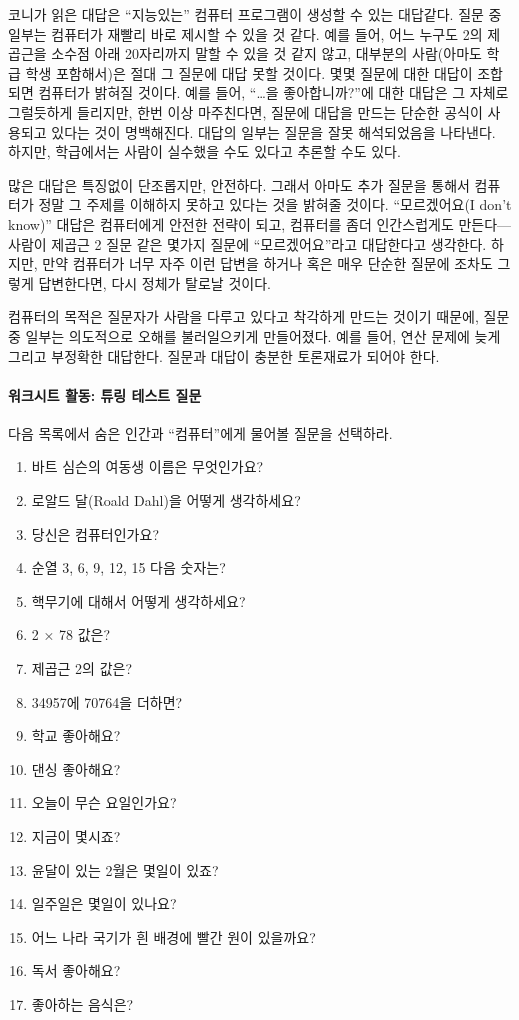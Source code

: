 \documentclass[]{article}
\begin{document}
코니가 읽은 대답은 ``지능있는'' 컴퓨터 프로그램이 생성할 수 있는
대답같다. 질문 중 일부는 컴퓨터가 재빨리 바로 제시할 수 있을 것 같다.
예를 들어, 어느 누구도 2의 제곱근을 소수점 아래 20자리까지 말할 수 있을
것 같지 않고, 대부분의 사람(아마도 학급 학생 포함해서)은 절대 그 질문에
대답 못할 것이다. 몇몇 질문에 대한 대답이 조합되면 컴퓨터가 밝혀질
것이다. 예를 들어, ``\ldots{}을 좋아합니까?''에 대한 대답은 그 자체로
그럴듯하게 들리지만, 한번 이상 마주친다면, 질문에 대답을 만드는 단순한
공식이 사용되고 있다는 것이 명백해진다. 대답의 일부는 질문을 잘못
해석되었음을 나타낸다. 하지만, 학급에서는 사람이 실수했을 수도 있다고
추론할 수도 있다.

많은 대답은 특징없이 단조롭지만, 안전하다. 그래서 아마도 추가 질문을
통해서 컴퓨터가 정말 그 주제를 이해하지 못하고 있다는 것을 밝혀줄
것이다. ``모르겠어요(I don't know)'' 대답은 컴퓨터에게 안전한 전략이
되고, 컴퓨터를 좀더 인간스럽게도 만든다--- 사람이 제곱근 2 질문 같은
몇가지 질문에 ``모르겠어요''라고 대답한다고 생각한다. 하지만, 만약
컴퓨터가 너무 자주 이런 답변을 하거나 혹은 매우 단순한 질문에 조차도
그렇게 답변한다면, 다시 정체가 탈로날 것이다.

컴퓨터의 목적은 질문자가 사람을 다루고 있다고 착각하게 만드는 것이기
때문에, 질문중 일부는 의도적으로 오해를 불러일으키게 만들어졌다. 예를
들어, 연산 문제에 늦게 그리고 부정확한 대답한다. 질문과 대답이 충분한
토론재료가 되어야 한다.

\mbox{}\paragraph{워크시트 활동: 튜링 테스트 질문}\label{section-275}

다음 목록에서 숨은 인간과 ``컴퓨터''에게 물어볼 질문을 선택하라.

\begin{enumerate}
\itemsep1pt\parskip0pt
\item
  바트 심슨의 여동생 이름은 무엇인가요?
\item
  로알드 달(Roald Dahl)을 어떻게 생각하세요?
\item
  당신은 컴퓨터인가요?
\item
  순열 3, 6, 9, 12, 15 다음 숫자는?
\item
  핵무기에 대해서 어떻게 생각하세요?
\item
  2 × 78 값은?
\item
  제곱근 2의 값은?
\item
  34957에 70764을 더하면?
\item
  학교 좋아해요?
\item
  댄싱 좋아해요?
\item
  오늘이 무슨 요일인가요?
\item
  지금이 몇시죠?
\item
  윤달이 있는 2월은 몇일이 있죠?
\item
  일주일은 몇일이 있나요?
\item
  어느 나라 국기가 흰 배경에 빨간 원이 있을까요?
\item
  독서 좋아해요?
\item
  좋아하는 음식은?
\end{enumerate}
\end{document}
